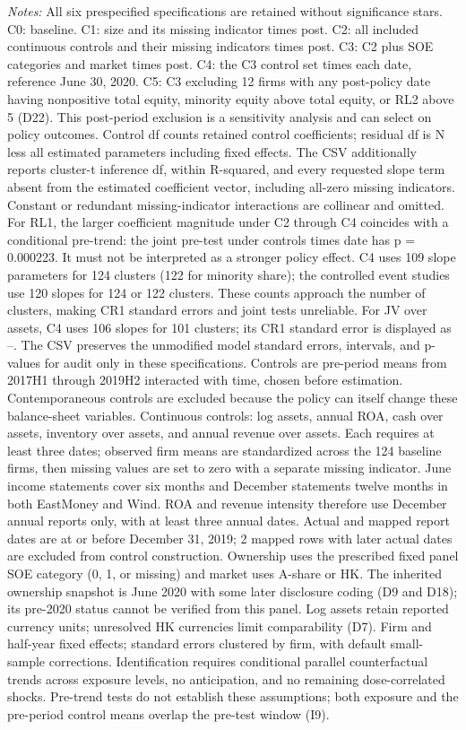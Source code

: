 \par\smallskip\noindent\begin{minipage}{\linewidth}\footnotesize
\textit{Notes:} All six prespecified specifications are retained without significance stars. C0: baseline. C1: size and its missing indicator times post. C2: all included continuous controls and their missing indicators times post. C3: C2 plus SOE categories and market times post. C4: the C3 control set times each date, reference June 30, 2020. C5: C3 excluding 12 firms with any post-policy date having nonpositive total equity, minority equity above total equity, or RL2 above 5 (D22). This post-period exclusion is a sensitivity analysis and can select on policy outcomes. Control df counts retained control coefficients; residual df is N less all estimated parameters including fixed effects. The CSV additionally reports cluster-t inference df, within R-squared, and every requested slope term absent from the estimated coefficient vector, including all-zero missing indicators. Constant or redundant missing-indicator interactions are collinear and omitted. For RL1, the larger coefficient magnitude under C2 through C4 coincides with a conditional pre-trend: the joint pre-test under controls times date has p = 0.000223. It must not be interpreted as a stronger policy effect. C4 uses 109 slope parameters for 124 clusters (122 for minority share); the controlled event studies use 120 slopes for 124 or 122 clusters. These counts approach the number of clusters, making CR1 standard errors and joint tests unreliable. For JV over assets, C4 uses 106 slopes for 101 clusters; its CR1 standard error is displayed as --. The CSV preserves the unmodified model standard errors, intervals, and p-values for audit only in these specifications. Controls are pre-period means from 2017H1 through 2019H2 interacted with time, chosen before estimation. Contemporaneous controls are excluded because the policy can itself change these balance-sheet variables. Continuous controls: log assets, annual ROA, cash over assets, inventory over assets, and annual revenue over assets. Each requires at least three dates; observed firm means are standardized across the 124 baseline firms, then missing values are set to zero with a separate missing indicator. June income statements cover six months and December statements twelve months in both EastMoney and Wind. ROA and revenue intensity therefore use December annual reports only, with at least three annual dates. Actual and mapped report dates are at or before December 31, 2019; 2 mapped rows with later actual dates are excluded from control construction. Ownership uses the prescribed fixed panel SOE category (0, 1, or missing) and market uses A-share or HK. The inherited ownership snapshot is June 2020 with some later disclosure coding (D9 and D18); its pre-2020 status cannot be verified from this panel. Log assets retain reported currency units; unresolved HK currencies limit comparability (D7). Firm and half-year fixed effects; standard errors clustered by firm, with default small-sample corrections. Identification requires conditional parallel counterfactual trends across exposure levels, no anticipation, and no remaining dose-correlated shocks. Pre-trend tests do not establish these assumptions; both exposure and the pre-period control means overlap the pre-test window (I9).
\end{minipage}\par\endgroup
